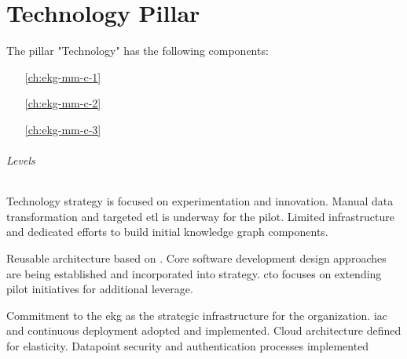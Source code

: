 \part{Technology Pillar}\label{pt:ekgmm-c} %

The pillar "Technology" has the following components:

\begin{itemize}[leftmargin=.5in]
    \item [\ref{ch:ekg-mm-c-1}] 
    \item [\ref{ch:ekg-mm-c-2}] 
    \item [\ref{ch:ekg-mm-c-3}] 
\end{itemize}

\paragraph{Levels}

\begin{description}[nosep,font=\bfseries]

    \item [1. \ekgmmLevelOneLabel]
    Technology strategy is focused on experimentation and innovation.
    Manual data transformation and targeted \gls{etl} is underway for the pilot.
    Limited infrastructure and dedicated efforts to build initial knowledge graph components.

    \item [2. \ekgmmLevelTwoLabel]
    Reusable architecture based on .
    Core software development design approaches are being established and incorporated
    into strategy.
    \gls{cto} focuses on extending pilot initiatives for additional leverage.

    \item [3. \ekgmmLevelThreeLabel]
    Commitment to the \gls{ekg} as the strategic infrastructure for the organization.
    \gls{iac} and continuous deployment adopted and implemented.
    Cloud architecture defined for elasticity.
    Datapoint security and authentication processes implemented

\end{description}




